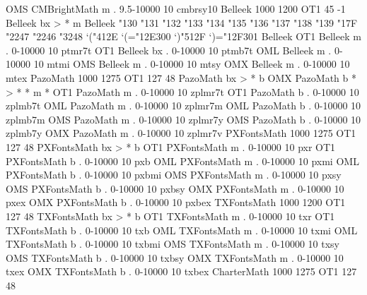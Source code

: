 \declarefont OMS CMBrightMath m . 9.5-10000 10 cmbrsy10
%
%
\declaremathfontfamily Belleek 1000 1200 OT1 45 -1
\fontmapseries Belleek bx > * m
\mathfontfamilyprehook Belleek {%
  \mathchardef\Gamma"130
  \mathchardef\Delta"131
  \mathchardef\Theta"132
  \mathchardef\Lambda"133
  \mathchardef\Xi"134
  \mathchardef\Pi"135
  \mathchardef\Sigma"136
  \mathchardef\Upsilon"137
  \mathchardef\Phi"138
  \mathchardef\Psi"139
  \mathchardef\Omega"17F
  \mathchardef\triangleleft"2247
  \mathchardef\triangleright"2246
  \mathchardef\Relbar"3248
  \mathcode`("412E \delcode`(="12E300
  \mathcode`)"512F \delcode`)="12F301
  \def\vec{\mathaccent"0245 }%
}%
\mathfontfamilyposthook Belleek {%
  \cm@upper@greek
  \cm@binary
  \cm@relations
  \cm@delims
  \cm@vec
}%
\declarefont OT1 Belleek m . 0-10000 10 ptmr7t
\declarefont OT1 Belleek bx . 0-10000 10 ptmb7t
\declarefont OML Belleek m . 0-10000 10 mtmi
\declarefont OMS Belleek m . 0-10000 10 mtsy
\declarefont OMX Belleek m . 0-10000 10 mtex
%
%
\declaremathfontfamily PazoMath 1000 1275 OT1 127 48
\fontmapseries PazoMath bx > * b
\fontmap OMX PazoMath b * > * * m *
\declarefont OT1 PazoMath m   .  0-10000 10 zplmr7t
\declarefont OT1 PazoMath b   .  0-10000 10 zplmb7t
\declarefont OML PazoMath m   .  0-10000 10 zplmr7m
\declarefont OML PazoMath b   .  0-10000 10 zplmb7m
\declarefont OMS PazoMath m   .  0-10000 10 zplmr7y
\declarefont OMS PazoMath b   .  0-10000 10 zplmb7y
\declarefont OMX PazoMath m   .  0-10000 10 zplmr7v
%
%
\declaremathfontfamily PXFontsMath 1000 1275 OT1 127 48
\fontmapseries PXFontsMath bx > * b
\declarefont OT1 PXFontsMath m   .  0-10000 10 pxr
\declarefont OT1 PXFontsMath b   .  0-10000 10 pxb
\declarefont OML PXFontsMath m   .  0-10000 10 pxmi
\declarefont OML PXFontsMath b   .  0-10000 10 pxbmi
\declarefont OMS PXFontsMath m   .  0-10000 10 pxsy
\declarefont OMS PXFontsMath b   .  0-10000 10 pxbsy
\declarefont OMX PXFontsMath m   .  0-10000 10 pxex
\declarefont OMX PXFontsMath b   .  0-10000 10 pxbex
%
%
\declaremathfontfamily TXFontsMath 1000 1200 OT1 127 48
\fontmapseries TXFontsMath bx > * b
\declarefont OT1 TXFontsMath m   .  0-10000 10 txr
\declarefont OT1 TXFontsMath b   .  0-10000 10 txb
\declarefont OML TXFontsMath m   .  0-10000 10 txmi
\declarefont OML TXFontsMath b   .  0-10000 10 txbmi
\declarefont OMS TXFontsMath m   .  0-10000 10 txsy
\declarefont OMS TXFontsMath b   .  0-10000 10 txbsy
\declarefont OMX TXFontsMath m   .  0-10000 10 txex
\declarefont OMX TXFontsMath b   .  0-10000 10 txbex
%
%
\declaremathfontfamily CharterMath 1000 1275 OT1 127 48

